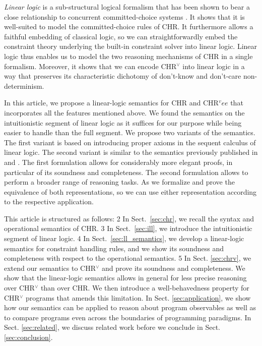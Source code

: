 \documentclass[acmtocl]{acmtrans2m}
\begin{document}
\emph{Linear logic} is a sub-structural logical formalism
\cite{DBLP:journals/tcs/Girard87} that has been shown  to bear a close
relationship to concurrent committed-choice systems
\cite{DBLP:conf/elp/Miller92,DBLP:journals/iandc/FagesRS01}. It shows that it is
well-suited to model the committed-choice rules of CHR. It furthermore allows a
faithful embedding of classical logic, so we can straightforwardly embed the
constraint theory underlying the built-in constraint solver into linear logic.
Linear logic thus enables us to model the two reasoning mechanisms of CHR in a
single formalism. Moreover, it shows that we can encode CHR$^\vee$ into linear
logic in a way that preserves its characteristic dichotomy of don't-know and
don't-care non-determinism.

In this article, we propose a linear-logic semantics for CHR and CHR$^vee$ that
incorporates all the features mentioned above. We found the semantics on the
intuitionistic segment of linear logic as it suffices for our purpose while
being easier to handle than the full segment. We propose two variants of the
semantics. The first variant is based on introducing proper axioms in the
sequent calculus of linear logic. The second variant is similar to the
semantics previously published in  and
. The first formulation allows for considerably
more elegant proofs, in particular of its soundness and completeness. The
second formulation allows to perform a broader range of reasoning tasks. As we
formalize and prove the equivalence of both representations, so we can use
either representation according to the respective application.

This article is structured as follows:
2
In Sect.~\ref{sec:chr}, we recall the syntax and operational semantics of CHR.
3
In Sect.~\ref{sec:ill}, we introduce the intuitionistic segment of linear logic.
4
In Sect.~\ref{sec:ll_semantics}, we develop a linear-logic semantics
for constraint handling rules, and we show its soundness and completeness with
respect to the operational semantics.
5
In Sect. \ref{sec:chrv}, we extend our semantics to CHR$^\vee$ and prove its
soundness and completeness. We show that the linear-logic semantics allows in
general for less precise reasoning over CHR$^\vee$ than over CHR. We
then introduce a well-behavedness property for CHR$^\vee$ programs that
amends this limitation.  In Sect. \ref{sec:application}, we show how our
semantics can be applied to reason about program observables as well as to
compare programs even across the boundaries of programming paradigms. In Sect.
\ref{sec:related}, we discuss related work before we conclude in Sect.
\ref{sec:conclusion}.
\end{document}
